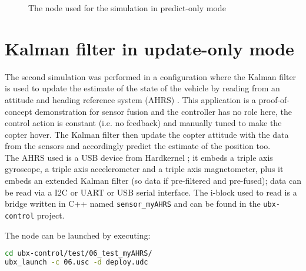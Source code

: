 \newpage
\begin{figure}
	\centering
	\label{fig:node04}
	\caption{The node used for the simulation in predict-only mode}
\end{figure}
\clearpage

\newpage
\begin{figure}
	\centering
	\label{fig:gfxdump1}
	\caption{}
\end{figure}
\clearpage


\section{Kalman filter in update-only mode}
The second simulation was performed in a configuration where the Kalman filter is used to update the estimate of the state of the vehicle by reading from an attitude and heading reference system (AHRS) \autocite{bib:wikiahrs}. This application is a proof-of-concept demonstration for sensor fusion and the controller has no role here, the control action is constant (i.e. no feedback) and manually tuned to make the copter hover. The Kalman filter then update the copter attitude with the data from the sensors and accordingly predict the estimate of the position too.\\
The AHRS used is a USB device from Hardkernel \autocite{bib:ahrsproduct}; it embeds a triple axis gyroscope, a triple axis accelerometer and a triple axis magnetometer, plus it embeds an extended Kalman filter (so data if pre-filtered and pre-fused); data can be read via a I2C or UART or USB serial interface. The i-block used to read is a bridge written in C++ named \texttt{sensor\_myAHRS} and can be found in the \texttt{ubx-control} project.

The node can be launched by executing:
\begin{lstlisting}[language=bash]
cd ubx-control/test/06_test_myAHRS/
ubx_launch -c 06.usc -d deploy.udc
\end{lstlisting}
